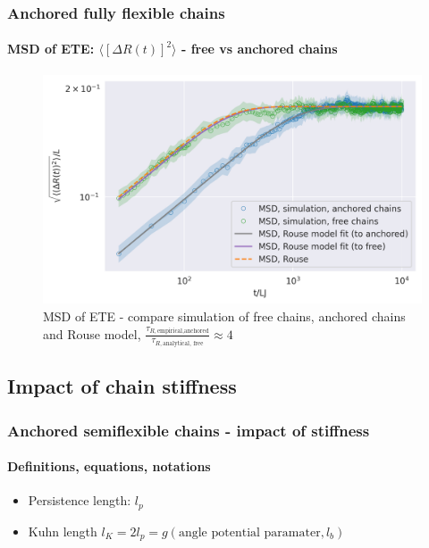 \documentclass[handout]{beamer}
\newcommand{\mean}[1]{\langle #1 \rangle}
\begin{document}
\begin{frame}
    \frametitle{Anchored fully flexible chains}
    \framesubtitle{MSD of ETE: $\mean{[\Delta R(t)]^2}$ - free vs anchored chains}

    \begin{figure}[h]
        \includegraphics[trim={0.1cm 0.1cm 0.1cm 1cm},clip,width=\textwidth]{./3-exp-free-param-log.png}
        \caption{
            MSD of ETE - compare simulation of free chains, anchored chains and Rouse model,
            $\frac{\tau_{R, \textrm{empirical,anchored}}}{\tau_{R, \textrm{analytical, free}}} \approx 4$
        }
        \label{fig:full-flex-chain-free-log}
    \end{figure}
\end{frame}

\subsection{Impact of chain stiffness}


\begin{frame}
    \frametitle{Anchored semiflexible chains - impact of stiffness}
    \framesubtitle{Definitions, equations, notations}
    \begin{itemize}
        \item Persistence length: $l_p$
        \item Kuhn length $l_K=2l_p=g(\text{angle potential paramater}, l_b)$
    \end{itemize}
\end{frame}

\end{document}
